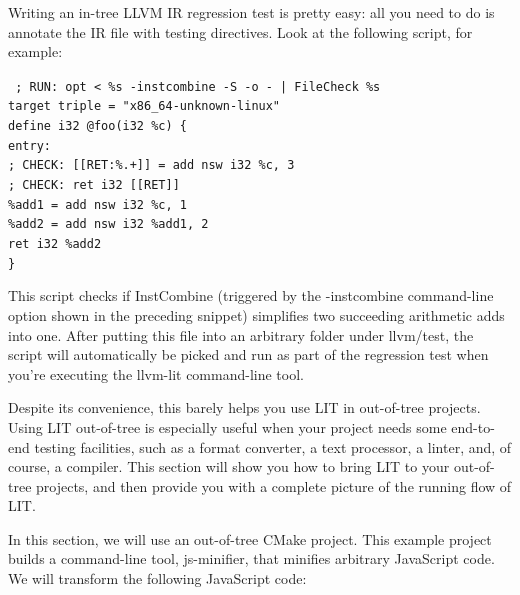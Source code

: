 Writing an in-tree LLVM IR regression test is pretty easy: all you need to do is annotate the IR file with testing directives. Look at the following script, for example:

\begin{tcolorbox}[colback=white,colframe=black]
\tt
{}
; RUN: opt < \%s -instcombine -S -o - | FileCheck \%s \\
target triple = "x86\_64-unknown-linux" \\
define i32 @foo(i32 \%c) \{ \\
\hspace*{0.3cm}entry: \\
\hspace*{0.3cm}; CHECK: [[RET:\%.+]] = add nsw i32 \%c, 3 \\
\hspace*{0.3cm}; CHECK: ret i32 [[RET]] \\
\hspace*{0.3cm}\%add1 = add nsw i32 \%c, 1 \\
\hspace*{0.3cm}\%add2 = add nsw i32 \%add1, 2 \\
\hspace*{0.3cm}ret i32 \%add2 \\
\}
\end{tcolorbox}

This script checks if InstCombine (triggered by the -instcombine command-line option shown in the preceding snippet) simplifies two succeeding arithmetic adds into one. After putting this file into an arbitrary folder under llvm/test, the script will automatically be picked and run as part of the regression test when you're executing the llvm-lit command-line tool.

Despite its convenience, this barely helps you use LIT in out-of-tree projects. Using LIT out-of-tree is especially useful when your project needs some end-to-end testing facilities, such as a format converter, a text processor, a linter, and, of course, a compiler. This section will show you how to bring LIT to your out-of-tree projects, and then provide you with a complete picture of the running flow of LIT.


In this section, we will use an out-of-tree CMake project. This example project builds a command-line tool, js-minifier, that minifies arbitrary JavaScript code. We will transform the following JavaScript code:

